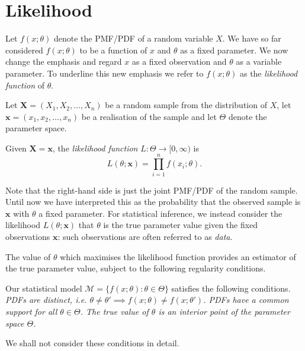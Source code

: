 
\section{Likelihood}\label{sec:likelihood}

Let $f(x;\theta)$ denote the PMF/PDF of a random variable $X$. We have so far considered $f(x;\theta)$ to be a function of $x$ and $\theta$ as a fixed parameter. We now change the emphasis and regard $x$ as a fixed observation and $\theta$ as a variable parameter. To underline this new emphasis we refer to $f(x;\theta)$ as the \emph{likelihood function} of $\theta$.

\bigskip
Let $\mathbf{X}=(X_1,X_2,\ldots,X_n)$ be a random sample from the distribution of $X$, let $\mathbf{x}=(x_1,x_2,\ldots,x_n)$ be a realisation of the sample and let $\Theta$ denote the parameter space.

\begin{definition}
Given $\mathbf{X}=\mathbf{x}$, the \emph{likelihood function} $L:\Theta\to [0,\infty)$ is
\[
L(\theta;\mathbf{x}) = \displaystyle\prod_{i=1}^n f(x_i;\theta).
\]
\end{definition}

Note that the right-hand side is just the joint PMF/PDF of the random sample. Until now we have interpreted this as the probability that the observed sample is $\mathbf{x}$ with $\theta$ a fixed parameter. For statistical inference, we instead consider the likelihood $L(\theta;\mathbf{x})$ that $\theta$ is the true parameter value given the fixed observations $\mathbf{x}$: such observations are often referred to as \emph{data}. 

\bigskip
The value of $\theta$ which maximises the likelihood function provides an estimator of the true parameter value, subject to the following regularity conditions.

\begin{condition}\label{cond:regularity1}
Our statistical model $\mathcal{M}=\{f(x;\theta):\theta\in\Theta\}$ satisfies the following conditions.
\ben
\it PDFs are distinct, i.e. $\theta\neq\theta' \implies f(x;\theta)\neq f(x;\theta')$.
\it PDFs have a common support for all $\theta\in\Theta$.
\it The true value of $\theta$ is an interior point of the parameter space $\Theta$.
\een
\end{condition}
We shall not consider these conditions in detail.

